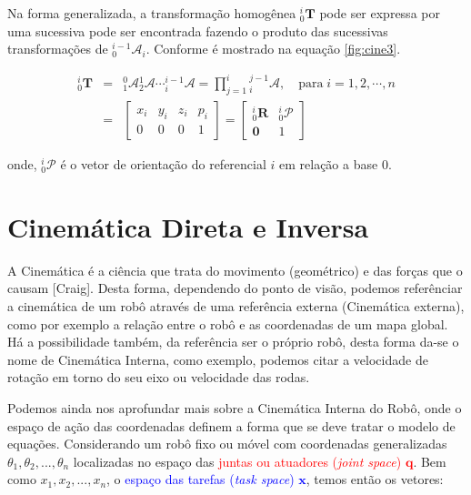     Na forma generalizada, a transformação homogênea ${}^{i}_0\mathbf{T}$ pode ser expressa por uma sucessiva pode ser encontrada fazendo o produto das sucessivas transformações de ${}^{i-1}_0\mathcal{A}_i$. Conforme é mostrado na equação \eqref{fig:cine3}.
    
    \begin{equation}\label{fig:cine3}
    \begin{array}{lcl}
    {}^i_0\mathbf{T} &= & {}^0_1\mathcal{A}{}^1_2\mathcal{A} \cdots {}^{i-1}_i\mathcal{A} = \prod \limits^i_{j=1}{}^{j-1}_i\mathcal{A}, \quad \mathrm{para\;}i=1,2,\cdots,n\\[.2cm]
    & = &
    \begin{bmatrix}
    x_i & y_i & z_i & p_i\\
    0 & 0 & 0 & 1
    \end{bmatrix} = 
    \begin{bmatrix}
    {}^i_0\mathbf{R} & {}^i_0\mathcal{P}\\
    \mathbf{0} & 1
    \end{bmatrix}
    \end{array}
    \end{equation}
    
    \noindent onde, ${}^i_0\mathcal{P}$ é o vetor de orientação do referencial $i$ em relação a base $0$.


\section{Cinemática Direta e Inversa}\label{intro-ch1}

A Cinemática é a ciência que trata do movimento (geométrico) e das forças que o causam [Craig]. Desta forma, dependendo do ponto de visão,
podemos referênciar a cinemática de um robô através de uma referência externa (Cinemática externa), como por exemplo a relação entre o robô e
as coordenadas de um mapa global. Há a possibilidade também, da referência ser o próprio robô, desta forma da-se o nome de
Cinemática Interna, como exemplo, podemos citar a velocidade de rotação em torno do seu eixo ou velocidade das rodas.

Podemos ainda nos aprofundar mais sobre a Cinemática Interna do Robô, onde o espaço de ação das coordenadas definem a forma que se deve tratar o modelo de equações.
Considerando um robô fixo ou móvel com coordenadas generalizadas $\theta_1, \theta_2,..., \theta_n$ localizadas no espaço das \textcolor{red}{juntas ou atuadores (\textit{joint space}) $\mathbf{q}$}. Bem como $x_1, x_2,..., x_n$, o \textcolor{blue}{espaço das tarefas (\textit{task space}) $\mathbf{x}$}, temos então os vetores:

